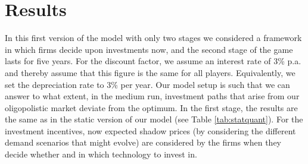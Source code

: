 \section{Results} 

In this first version of the model with only two stages we considered a framework in which firms decide upon investments now, and the second stage of the game lasts for five years. For the discount factor, we assume an interest rate of 3\% p.a. and thereby assume that this figure is the same for all players. Equivalently, we set the depreciation rate to 3\% per year. Our model setup is such that we can answer to what extent, in the medium run, investment paths that arise from our oligopolistic market deviate from the optimum. In the first stage, the results are the same as in the static version of our model (see Table \ref{tab:statquant}). For the investment incentives, now expected shadow prices (by considering the different demand scenarios that might evolve) are considered by the firms when they decide whether and in which technology to invest in.

